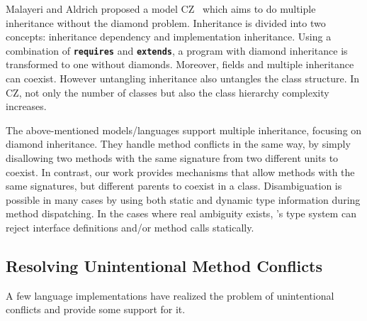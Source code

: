 \begin{comment}
There are also proposals for extending Java with traits. For example, 
FeatherTrait Java (FTJ) [14] extends FJ [13] with statically-typed traits, 
adding trait-based inheritance in Java. Except for few, mostly syntac- tic details, 
their work can be emulated with Java 8 interfaces. There are also extensions 
to the original trait model, with operations (e.g. renaming [18], which breaks 
structural sub- typing) that default methods and interfaces cannot model.
\end{comment}

Malayeri and Aldrich proposed a model CZ~\cite{malayeri2009cz} which
aims to do multiple inheritance without the diamond problem.
Inheritance is divided into two concepts: inheritance dependency and
implementation inheritance.  Using a combination of
\textbf{\texttt{requires}} and \textbf{\texttt{extends}}, a program
with diamond inheritance is transformed to one without
diamonds. Moreover, fields and multiple inheritance can coexist.
However untangling inheritance also untangles the class structure. In
CZ, not only the number of classes but also the class hierarchy
complexity increases.

The above-mentioned models/languages support multiple inheritance, 
focusing on diamond inheritance.
They handle method conflicts in the same way, by simply disallowing
two methods with the same signature from two different units to
coexist. In contrast, our work provides mechanisms that allow 
methods with the same signatures, but different parents to coexist 
in a class. Disambiguation is possible in many cases by using both 
static and dynamic type information during method dispatching.
In the cases where real ambiguity exists, \MIM{}'s type system can
reject interface definitions and/or method calls statically.

\subsection{Resolving Unintentional Method Conflicts}\label{subsec:middleman}
A few language implementations have realized the problem of
unintentional conflicts and provide some support for it.

